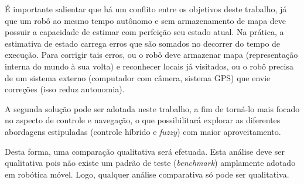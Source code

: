 É importante salientar que há um conflito entre os objetivos deste trabalho,
já que um robô ao mesmo tempo autônomo e sem armazenamento de mapa deve possuir
a capacidade de estimar com perfeição seu estado atual. Na prática, a estimativa
de estado carrega erros que são somados no decorrer do tempo de execução. Para
corrigir tais erros, ou o robô deve armazenar mapa (representação interna do
mundo à sua volta) e reconhecer locais já visitados, ou o robô precisa de um
sistema externo (computador com câmera, sistema GPS) que envie correções
(isso reduz autonomia). 

A segunda solução pode ser adotada neste trabalho, a fim de torná-lo mais focado
no aspecto de controle e navegação, o que possibilitará explorar as diferentes
abordagens estipuladas (controle híbrido e \textit{fuzzy}) com maior
aproveitamento. 

Desta forma, uma comparação qualitativa será efetuada. Esta análise
deve ser qualitativa pois não existe um padrão de teste (\textit{benchmark})
amplamente adotado em robótica móvel. Logo, qualquer análise comparativa só pode
ser qualitativa.









